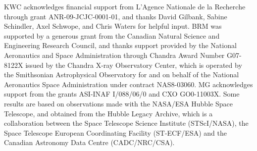 \documentclass[11pt, preprint]{aastex}
\begin{document}
\acknowledgements

KWC acknowledges financial support from L'Agence Nationale de la
Recherche through grant ANR-09-JCJC-0001-01, and thanks David Gilbank,
Sabine Schindler, Axel Schwope, and Chris Waters for helpful
input. BRM was supported by a generous grant from the Canadian Natural
Science and Engineering Research Council, and thanks support provided
by the National Aeronautics and Space Administration through Chandra
Award Number G07-8122X issued by the Chandra X-ray Observatory Center,
which is operated by the Smithsonian Astrophysical Observatory for and
on behalf of the National Aeronautics Space Administration under
contract NAS8-03060. MG acknowledges support from the grants ASI-INAF
I/088/06/0 and CXO GO0-11003X. Some results are based on observations
made with the NASA/ESA Hubble Space Telescope, and obtained from the
Hubble Legacy Archive, which is a collaboration between the Space
Telescope Science Institute (STScI/NASA), the Space Telescope European
Coordinating Facility (ST-ECF/ESA) and the Canadian Astronomy Data
Centre (CADC/NRC/CSA).





\clearpage






\end{document}
